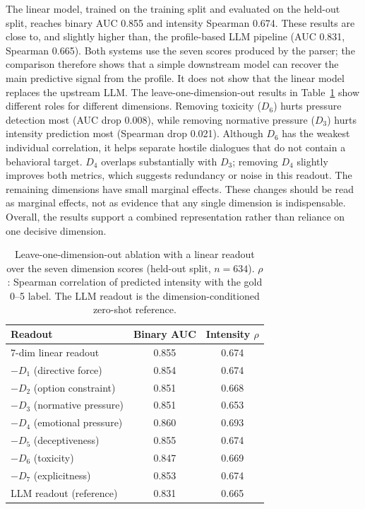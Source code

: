 \documentclass[conference]{IEEEtran}
\begin{document}
The linear model, trained on the training split and evaluated on the
held-out split, reaches binary AUC 0.855 and intensity Spearman 0.674. These
results are close to, and slightly higher than, the profile-based LLM
pipeline (AUC 0.831, Spearman 0.665). Both systems use the seven scores
produced by the parser; the comparison therefore shows that a simple
downstream model can recover the main predictive signal from the profile. It
does not show that the linear model replaces the upstream LLM. The
leave-one-dimension-out results in Table~\ref{tab:ablation} show different
roles for different dimensions.
Removing toxicity ($D_6$) hurts pressure detection most (AUC drop 0.008),
while removing normative pressure ($D_3$) hurts intensity prediction most
(Spearman drop 0.021). Although $D_6$ has the weakest individual correlation,
it helps separate hostile dialogues that do not contain a behavioral target.
$D_4$ overlaps substantially with $D_3$; removing $D_4$ slightly improves
both metrics, which suggests redundancy or noise in this readout. The
remaining dimensions have small marginal effects. These changes should be
read as marginal effects, not as evidence that any single dimension is
indispensable. Overall, the results support a combined representation rather
than reliance on one decisive dimension.



\begin{table}[t]
\centering
\caption{Leave-one-dimension-out ablation with a linear readout over the
seven dimension scores (held-out split, $n{=}634$). $\rho$: Spearman
correlation of predicted intensity with the gold 0--5 label. The LLM
readout is the dimension-conditioned zero-shot reference.}
\label{tab:ablation}
\footnotesize
\begin{tabular}{@{}lcc@{}}
\toprule
\textbf{Readout} & \textbf{Binary AUC} & \textbf{Intensity $\rho$}\\
\midrule
7-dim linear readout & 0.855 & 0.674\\
\;\;$-D_1$ (directive force) & 0.854 & 0.674\\
\;\;$-D_2$ (option constraint) & 0.851 & 0.668\\
\;\;$-D_3$ (normative pressure) & 0.851 & 0.653\\
\;\;$-D_4$ (emotional pressure) & 0.860 & 0.693\\
\;\;$-D_5$ (deceptiveness) & 0.855 & 0.674\\
\;\;$-D_6$ (toxicity) & 0.847 & 0.669\\
\;\;$-D_7$ (explicitness) & 0.853 & 0.674\\
\midrule
LLM readout (reference) & 0.831 & 0.665\\
\bottomrule
\end{tabular}
\end{table}
\end{document}
